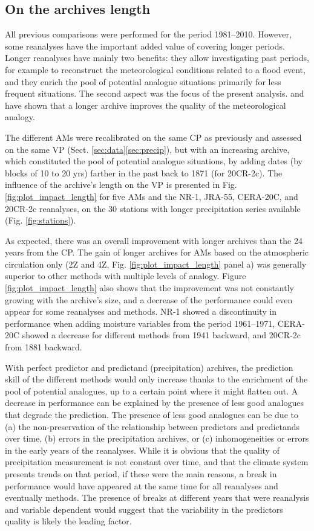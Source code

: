 \documentclass{ametsoc}
\begin{document}
\subsection{On the archives length}
\label{sec:length}

All previous comparisons were performed for the period 1981--2010. However, some reanalyses have the important added value of covering longer periods. Longer reanalyses have mainly two benefits: they allow investigating past periods, for example to reconstruct the meteorological conditions related to a flood event, and they enrich the pool of potential analogue situations primarily for less frequent situations. The second aspect was the focus of the present analysis. \citet{Ruosteenoja1988} and \citet{Vandendool1994} have shown that a longer archive improves the quality of the meteorological analogy.

The different AMs were recalibrated on the same CP as previously and assessed on the same VP (Sect. \ref{sec:data}\ref{sec:precip}), but with an increasing archive, which constituted the pool of potential analogue situations, by adding dates (by blocks of 10 to 20 yrs) farther in the past back to 1871 (for 20CR-2c). The influence of the archive's length on the VP is presented in Fig. \ref{fig:plot_impact_length} for five AMs and the NR-1, JRA-55, CERA-20C, and 20CR-2c reanalyses, on the 30 stations with longer precipitation series available (Fig. \ref{fig:stations}). 

As expected, there was an overall improvement with longer archives than the 24 years from the CP. The gain of longer archives for AMs based on the atmospheric circulation only (2Z and 4Z, Fig. \ref{fig:plot_impact_length} panel a) was generally superior to other methods with multiple levels of analogy. Figure \ref{fig:plot_impact_length} also shows that the improvement was not constantly growing with the archive's size, and a decrease of the performance could even appear for some reanalyses and methods. NR-1 showed a discontinuity in performance when adding moisture variables from the period 1961--1971, CERA-20C showed a decrease for different methods from 1941 backward, and 20CR-2c from 1881 backward.

With perfect predictor and predictand (precipitation) archives, the prediction skill of the different methods would only increase thanks to the enrichment of the pool of potential analogues, up to a certain point where it might flatten out. A decrease in performance can be explained by the presence of less good analogues that degrade the prediction. The presence of less good analogues can be due to (a) the non-preservation of the relationship between predictors and predictands over time, (b) errors in the precipitation archives, or (c) inhomogeneities or errors in the early years of the reanalyses. While it is obvious that the quality of precipitation measurement is not constant over time, and that the climate system presents trends on that period, if these were the main reasons, a break in performance would have appeared at the same time for all reanalyses and eventually methods. The presence of breaks at different years that were reanalysis and variable dependent would suggest that the variability in the predictors quality is likely the leading factor.
\end{document}
